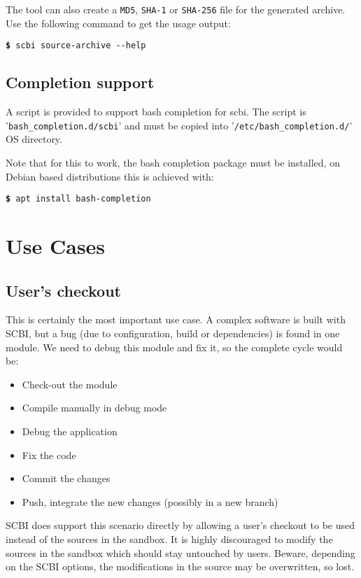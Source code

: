 \documentclass[a4paper,12pt,twoside]{article}
\newcommand{\code}[1]{\texttt{#1}}
\newcommand{\file}[1]{'{\texttt{#1}}'}
\newcommand{\cmd}[1]{\tabto{1cm}\hspace{0.5cm}\texttt{\textbf{\$} #1}}
\let\stdsection\section
\renewcommand\section{\newpage\stdsection}
\newcommand{\ddash}{-{}-}
\begin{document}
The tool can also create a \code{MD5}, \code{SHA-1} or \code{SHA-256}
file for the generated archive. Use the following command to get the usage output:

\cmd{scbi source-archive \ddash{}help}

\subsection{Completion support}
\label{completion}

A script is provided to support bash completion for scbi. The script is \file{bash\_completion.d/scbi} and must be copied into \file{/etc/bash\_completion.d/} OS directory.

Note that for this to work, the bash completion package must be installed, on Debian based distributions this is achieved with:

\cmd{apt install bash-completion}


\section{Use Cases}

\subsection{User's checkout}
\label{userco}

This is certainly the most important use case. A complex software is built with SCBI, but a bug (due to configuration, build or dependencies) is found in one module. We need to debug this module and fix it, so the complete cycle would be:

\begin{itemize}
	\item Check-out the module
	\item Compile manually in debug mode
	\item Debug the application
	\item Fix the code
	\item Commit the changes
	\item Push, integrate the new changes (possibly in a new branch)
\end{itemize}

SCBI does support this scenario directly by allowing a user's checkout to be used instead of the sources in the sandbox. It is highly discouraged to modify the sources in the sandbox which should stay untouched by users. Beware, depending on the SCBI options, the modifications in the source may be overwritten, so lost.
\end{document}
